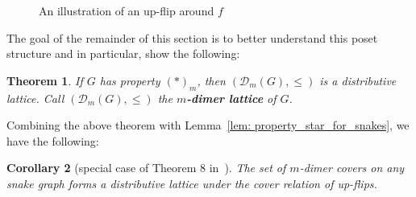 \documentclass[11pt]{amsart}
\newtheorem{thm}{Theorem}[section]
\newtheorem{cor}[thm]{Corollary}
\theoremstyle{definition}
\theoremstyle{remark}
\numberwithin{equation}{section}
\begin{document}
\begin{figure}[h!]
    \centering
    
    \caption{An illustration of an up-flip around $f$}
    \label{fig:up_flip}
\end{figure}

The goal of the remainder of this section is to better understand this poset structure and in particular, show the following:
\begin{thm}\label{thm: dist_lattice_of_m}
    If $G$ has property $(*)_m$, then $(\mathcal{D}_m(G), \leq )$ is a distributive lattice. Call $(\mathcal{D}_m(G), \leq )$ the \textbf{$m$-dimer lattice} of $G$.
\end{thm}

Combining the above theorem with Lemma~\ref{lem: property_star_for_snakes}, we have the following:

\begin{cor}[special case of Theorem 8 in~\cite{claussen2025mixeddimermodelseuler}]
    The set of $m$-dimer covers on any snake graph forms a distributive lattice under the cover relation of up-flips.
\end{cor}
\end{document}
